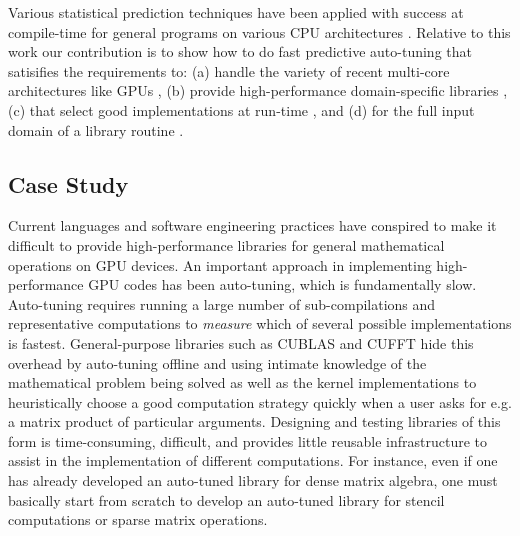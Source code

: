 \documentclass{sig-alternate}
\begin{document}
Various statistical prediction techniques have been applied with
success at compile-time for general programs on various CPU architectures
\citep{monsifrot2002machine, stephenson2003meta, yotov2003comparison,
kulkarni2004fast, cooper2005acme, franke2005probabilistic,
hutter2006performance, cavazos2007rapidly, cavazos2008intelligent,
hartono2009annotation, park2011evaluation, fursin2008milepost}.
Relative to this work our contribution is to show
how to do fast predictive auto-tuning that satisifies the requirements to:
(a) handle the variety of recent multi-core architectures like GPUs \citep{schaa2009exploring},
(b) provide high-performance domain-specific libraries \citep{nukada2009auto, li2009note, kamil2010auto},
(c) that select good implementations at run-time \citep{klockner2011pycuda, pinto+cox:2011gcg}, and
(d) for the full input domain of a library routine \citep{liu2009cross, grauer2011optimizing}.

\subsection{Case Study}
Current languages and software engineering practices have conspired to make it difficult
to provide high-performance libraries for general mathematical operations on GPU devices.
An important approach in implementing high-performance GPU codes has been auto-tuning,
which is fundamentally slow. Auto-tuning requires running a large number of
sub-compilations and representative computations to {\em measure} which
of several possible implementations is fastest. General-purpose libraries such
as CUBLAS and CUFFT hide this overhead by auto-tuning offline and using
intimate knowledge of the mathematical problem being solved as well as the
kernel implementations to heuristically choose a good computation strategy quickly when a
user asks for e.g. a matrix product of particular arguments.
Designing and testing libraries of this form is time-consuming, difficult, and provides little
reusable infrastructure to assist in the implementation of different computations.
For instance, even if one has already developed an auto-tuned library for dense matrix algebra, 
one must basically start from scratch to develop an auto-tuned library for
stencil computations or sparse matrix operations.
\end{document}
